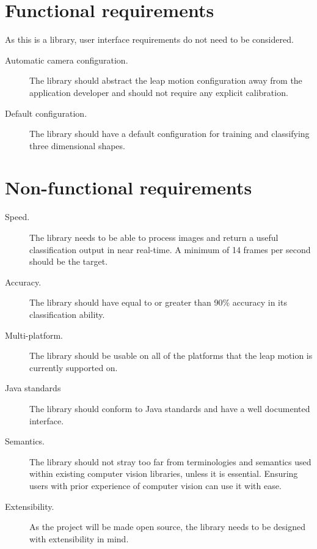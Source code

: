 \documentclass[11pt,oneside]{report}
\begin{document}
		\section{Functional requirements}
			
			As this is a library, user interface requirements do not need to be considered.
			\begin{description}
				\item[Automatic camera configuration.] The library should abstract the leap motion configuration away from the application developer and should not require any explicit calibration.
				\item[Default configuration.] The library should have a default configuration for training and classifying three dimensional shapes.
			\end{description}
				
			
		\section{Non-functional requirements}
			\begin{description}
				\item[Speed.] The library needs to be able to process images and return a useful classification output in near real-time. 
				A minimum of 14 frames per second should be the target.
				\item[Accuracy.] The library should have equal to or greater than 90\% accuracy in its classification ability.
				\item[Multi-platform.] The library should be usable on all of the platforms that the leap motion is currently supported on.
				\item[Java standards] The library should conform to Java standards and have a well documented interface.
				\item[Semantics.] The library should not stray too far from terminologies and semantics used within existing computer vision libraries, unless it is essential. Ensuring users with prior experience of computer vision can use it with ease.
				\item[Extensibility.] As the project will be made open source, the library needs to be designed with extensibility in mind.
			\end{description}
			
\end{document}
